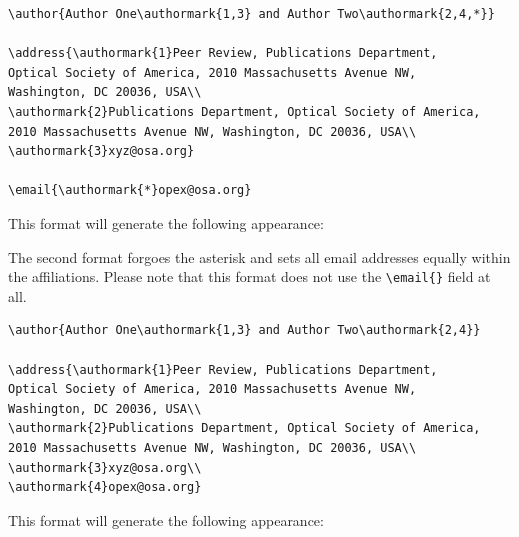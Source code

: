\documentclass{osa-article}
\begin{document}
\begin{verbatim}
\author{Author One\authormark{1,3} and Author Two\authormark{2,4,*}}

\address{\authormark{1}Peer Review, Publications Department,
Optical Society of America, 2010 Massachusetts Avenue NW,
Washington, DC 20036, USA\\
\authormark{2}Publications Department, Optical Society of America,
2010 Massachusetts Avenue NW, Washington, DC 20036, USA\\
\authormark{3}xyz@osa.org}

\email{\authormark{*}opex@osa.org}
\end{verbatim}

This format will generate the following appearance:

\medskip

\author{Author One and Author Two}

\address{Peer Review, Publications Department,
Optical Society of America, 2010 Massachusetts Avenue NW,
Washington, DC 20036, USA\\
Publications Department, Optical Society of America,
2010 Massachusetts Avenue NW, Washington, DC 20036, USA\\
xyz@osa.org}


\medskip

The second format forgoes the asterisk and sets all email addresses equally within the affiliations. Please note that this format does not use the \verb+\email{}+ field at all.
\begin{verbatim}
\author{Author One\authormark{1,3} and Author Two\authormark{2,4}}

\address{\authormark{1}Peer Review, Publications Department,
Optical Society of America, 2010 Massachusetts Avenue NW,
Washington, DC 20036, USA\\
\authormark{2}Publications Department, Optical Society of America,
2010 Massachusetts Avenue NW, Washington, DC 20036, USA\\
\authormark{3}xyz@osa.org\\
\authormark{4}opex@osa.org}
\end{verbatim}

This format will generate the following appearance:

\medskip

\author{Author One and Author Two}
\end{document}
